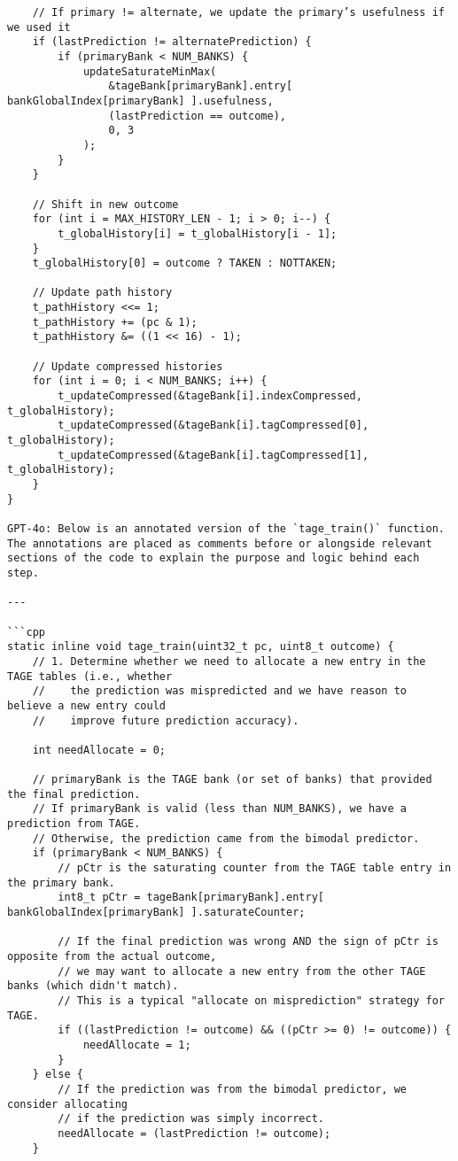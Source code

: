 \documentclass[11pt]{article}
\begin{document}
\begin{verbatim}
    // If primary != alternate, we update the primary’s usefulness if we used it
    if (lastPrediction != alternatePrediction) {
        if (primaryBank < NUM_BANKS) {
            updateSaturateMinMax(
                &tageBank[primaryBank].entry[ bankGlobalIndex[primaryBank] ].usefulness,
                (lastPrediction == outcome),
                0, 3
            );
        }
    }

    // Shift in new outcome
    for (int i = MAX_HISTORY_LEN - 1; i > 0; i--) {
        t_globalHistory[i] = t_globalHistory[i - 1];
    }
    t_globalHistory[0] = outcome ? TAKEN : NOTTAKEN;

    // Update path history
    t_pathHistory <<= 1;
    t_pathHistory += (pc & 1);
    t_pathHistory &= ((1 << 16) - 1);

    // Update compressed histories
    for (int i = 0; i < NUM_BANKS; i++) {
        t_updateCompressed(&tageBank[i].indexCompressed, t_globalHistory);
        t_updateCompressed(&tageBank[i].tagCompressed[0], t_globalHistory);
        t_updateCompressed(&tageBank[i].tagCompressed[1], t_globalHistory);
    }
}

GPT-4o: Below is an annotated version of the `tage_train()` function. The annotations are placed as comments before or alongside relevant sections of the code to explain the purpose and logic behind each step.

---

```cpp
static inline void tage_train(uint32_t pc, uint8_t outcome) {
    // 1. Determine whether we need to allocate a new entry in the TAGE tables (i.e., whether
    //    the prediction was mispredicted and we have reason to believe a new entry could
    //    improve future prediction accuracy).

    int needAllocate = 0;

    // primaryBank is the TAGE bank (or set of banks) that provided the final prediction.
    // If primaryBank is valid (less than NUM_BANKS), we have a prediction from TAGE.
    // Otherwise, the prediction came from the bimodal predictor.
    if (primaryBank < NUM_BANKS) {
        // pCtr is the saturating counter from the TAGE table entry in the primary bank.
        int8_t pCtr = tageBank[primaryBank].entry[ bankGlobalIndex[primaryBank] ].saturateCounter;

        // If the final prediction was wrong AND the sign of pCtr is opposite from the actual outcome,
        // we may want to allocate a new entry from the other TAGE banks (which didn't match).
        // This is a typical "allocate on misprediction" strategy for TAGE.
        if ((lastPrediction != outcome) && ((pCtr >= 0) != outcome)) {
            needAllocate = 1;
        }
    } else {
        // If the prediction was from the bimodal predictor, we consider allocating
        // if the prediction was simply incorrect.
        needAllocate = (lastPrediction != outcome);
    }


\end{verbatim}
\end{document}
